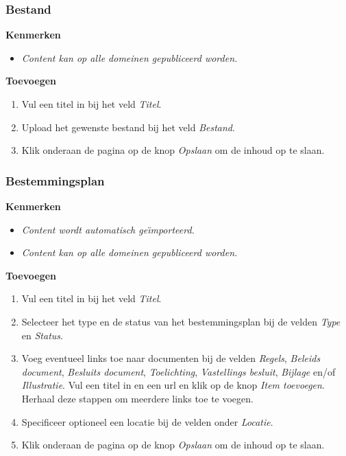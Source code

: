 \subsubsection{Bestand}\label{bestand}

\textbf{Kenmerken}

\begin{itemize}
\item \emph{Content kan op alle domeinen gepubliceerd worden.}
\end{itemize}

\textbf{Toevoegen}

\begin{enumerate}
\item Vul een titel in bij het veld \emph{Titel}.
\item Upload het gewenste bestand bij het veld \emph{Bestand}.
\item Klik onderaan de pagina op de knop \emph{Opslaan} om de inhoud op te slaan.
\end{enumerate}

\subsubsection{Bestemmingsplan}\label{bestemmingsplan}

\textbf{Kenmerken}

\begin{itemize}
\item \emph{Content wordt automatisch ge{\"\i}mporteerd.}
\item \emph{Content kan op alle domeinen gepubliceerd worden.}
\end{itemize}

\textbf{Toevoegen}

\begin{enumerate}
\item Vul een titel in bij het veld \emph{Titel}.
\item Selecteer het type en de status van het bestemmingsplan bij de velden \emph{Type} en \emph{Status}.
\item Voeg eventueel links toe naar documenten bij de velden \emph{Regels}, \emph{Beleids document}, \emph{Besluits document}, \emph{Toelichting}, \emph{Vastellings besluit}, \emph{Bijlage} en/of \emph{Illustratie}. Vul een titel in en een url en klik op de knop \emph{Item toevoegen}. Herhaal deze stappen om meerdere links toe te voegen. 
\item Specificeer optioneel een locatie bij de velden onder \emph{Locatie}.
\item Klik onderaan de pagina op de knop \emph{Opslaan} om de inhoud op te slaan.
\end{enumerate}

